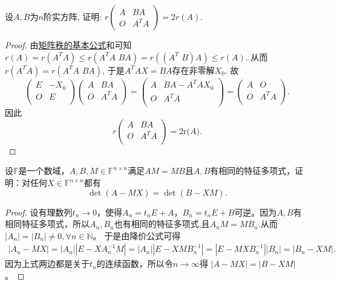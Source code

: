 \documentclass[../../main.tex]{subfiles}%
\begin{document}
\begin{example}
设$A,B$为$n$阶实方阵, 证明: $r\begin{pmatrix} A & BA \\ O & A^{T}A \end{pmatrix}=2r(A)$.
\end{example}
\begin{proof}
由\hyperref[proposition:矩阵秩的基本公式]{矩阵秩的基本公式}和可知
$r\left( A \right) =r\left( A^TA \right) \leqslant r\left( A^TA\,\,BA \right) =r\left( \left( A^T\,\,B \right) A \right) \leqslant r\left( A \right) .$
从而$r\left( A^TA \right) =r\left( A^TA\,\,BA \right) $, 于是$A^TAX=BA$存在非零解$X_0$. 故
$$\left( \begin{matrix}
E&		-X_0\\
O&		E\\
\end{matrix} \right) \left( \begin{matrix}
A&		BA\\
O&		A^{T}A\\
\end{matrix} \right) =\left( \begin{matrix}
A&		BA-A^TAX_0\\
O&		A^{T}A\\
\end{matrix} \right) =\left( \begin{matrix}
A&		O\\
O&		A^{T}A\\
\end{matrix} \right) .$$
因此
$$r\left( \begin{matrix}
A&		BA\\
O&		A^{T}A\\
\end{matrix} \right) =2\mathrm{r(}A).$$
\end{proof}

\begin{example}
设$\mathbb{F}$是一个数域，$A,B,M \in \mathbb{F}^{n \times n}$满足$AM = MB$且$A,B$有相同的特征多项式，证明：对任何$X \in \mathbb{F}^{n \times n}$都有
\[
\det (A - MX) = \det (B - XM). 
\]
\end{example}
\begin{proof}
设有理数列$t_n\rightarrow 0$，使得$A_n=t_nE+A$，$B_n=t_nE+B$可逆。因为$A,B$有相同特征多项式，所以$A_n,B_n$也有相同的特征多项式,且$A_nM=MB_n$.从而 $|A_n|=|B_n|\ne 0,\forall n\in \mathbb{N}$。
于是由降价公式可得
\begin{align*}
|A_n - MX| = |A_n| |E - X A_n^{-1} M| = |A_n| |E - X M B_n^{-1}| 
= |E - M X B_n^{-1}| |B_n| = |B_n - X M|.
\end{align*}
因为上式两边都是关于$t_n$的连续函数，所以令$n\rightarrow \infty$得 $|A - MX| = |B - X M|$。
\end{proof}
\end{document}
